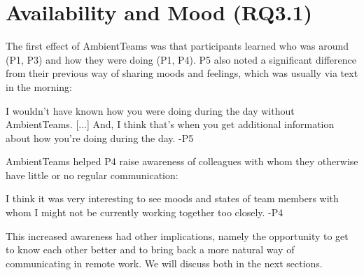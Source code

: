 


\section{Availability and Mood (RQ3.1)}
\label{section:availability_and_mood}
The first effect of AmbientTeams was that participants learned who was around (P1, P3) and how they were doing (P1, P4). P5 also noted a significant difference from their previous way of sharing moods and feelings, which was usually via text in the morning:


\begin{displayquote}[][]
    [...] I wouldn't have known how you were doing during the day without AmbientTeams. [...] And, I think that's when you get additional information about how you're doing during the day. -P5
\end{displayquote}

AmbientTeams helped P4 raise awareness of colleagues with whom they otherwise have little or no regular communication:

\begin{displayquote}
    I think it was very interesting to see moods and states of team members with whom I might not be currently working together too closely. -P4 
\end{displayquote}

This increased awareness had other implications, namely the opportunity to get to know each other better and to bring back a more natural way of communicating in remote work. We will discuss both in the next sections.

